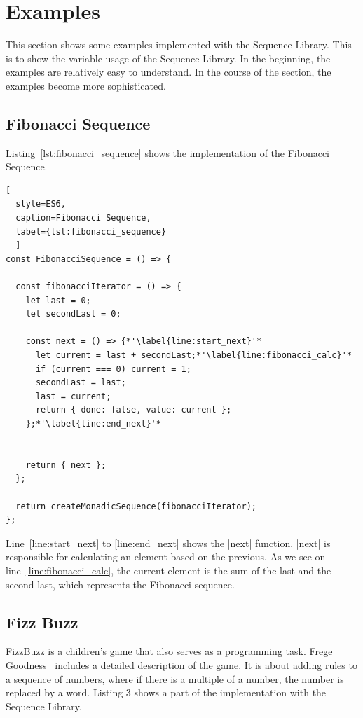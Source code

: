 \section{Examples} %
\label{sec:Examples}This section shows some examples implemented with the
Sequence Library. This is to show the variable usage of the Sequence Library.
In the beginning, the examples are relatively easy to understand. In the course
of the section, the examples become more sophisticated.

\subsection{Fibonacci Sequence}
\label{sub:Fibonacci Sequence}
Listing~\ref{lst:fibonacci_sequence} shows the implementation of the Fibonacci Sequence.

\begin{lstlisting}[
  style=ES6, 
  caption=Fibonacci Sequence,
  label={lst:fibonacci_sequence}
  ]
const FibonacciSequence = () => {

  const fibonacciIterator = () => {
    let last = 0;
    let secondLast = 0;

    const next = () => {*'\label{line:start_next}'*
      let current = last + secondLast;*'\label{line:fibonacci_calc}'*
      if (current === 0) current = 1;
      secondLast = last;
      last = current;
      return { done: false, value: current };
    };*'\label{line:end_next}'*


    return { next };
  };

  return createMonadicSequence(fibonacciIterator);
};
\end{lstlisting}
Line~\ref{line:start_next} to \ref{line:end_next} shows the |next| function. |next| is responsible for calculating an
element based on the previous. As we see on line~\ref{line:fibonacci_calc}, the current element is the
sum of the last and the second last, which represents the Fibonacci sequence.

\subsection{Fizz Buzz}
\label{sub:Fizz Buzz}
FizzBuzz is a children's game that also serves as a programming task. Frege
Goodness~\cite{frege_goodness} includes a detailed description of the game.
It is about adding rules to a sequence of numbers, where if there is a multiple
of a number, the number is replaced by a word. Listing 3 shows a part of the
implementation with the Sequence Library.

